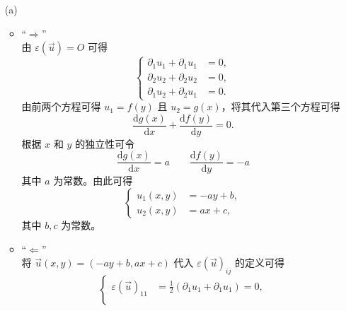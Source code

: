 \documentclass[a4paper]{article}
\begin{document}
\begin{enumerate}
    \item[(a)] 
        \begin{itemize}
            \item “$\Rightarrow$”\\
                由 $\varepsilon(\vec{u}) = O$ 可得
                \begin{equation}
                    \left\{
                    \begin{aligned}
                        \partial_1 u_1 + \partial_1 u_1 &= 0,\\
                        \partial_2 u_2 + \partial_2 u_2 &= 0,\\
                        \partial_1 u_2 + \partial_2 u_1 &= 0.
                    \end{aligned}
                    \right.
                \end{equation}
                由前两个方程可得 $u_1 = f(y)$ 且 $u_2 = g(x)$，将其代入第三个方程可得
                \begin{equation}
                    \frac{\text{d}g(x)}{\text{d}x} + \frac{\text{d}f(y)}{\text{d}y} = 0.
                \end{equation}
                根据 $x$ 和 $y$ 的独立性可令
                \begin{equation}
                    \frac{\text{d}g(x)}{\text{d}x} = a \qquad \frac{\text{d}f(y)}{\text{d}y} = -a
                \end{equation}
                其中 $a$ 为常数。由此可得
                \begin{equation}
                    \left\{
                    \begin{aligned}
                        u_1(x,y) &= -ay + b,\\  
                        u_2(x,y) &= ax + c,
                    \end{aligned}
                    \right.
                \end{equation}
                其中 $b,c$ 为常数。
            \item “$\Leftarrow$”\\
                将 $\vec{u}(x,y)=(-ay+b,ax+c)$
                代入 $\varepsilon(\vec{u})_{ij}$ 的定义可得
                \begin{equation}
                    \left\{
                    \begin{aligned}
                        \varepsilon(\vec{u})_{11} &= \frac{1}{2}(\partial_1 u_1 + \partial_1 u_1) = 0,\\

\end{aligned}
\end{equation}
\end{itemize}
\end{enumerate}
\end{document}

